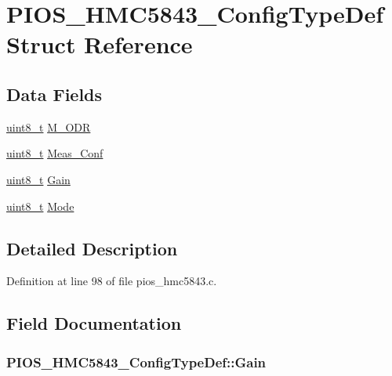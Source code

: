 \hypertarget{struct_p_i_o_s___h_m_c5843___config_type_def}{\section{P\-I\-O\-S\-\_\-\-H\-M\-C5843\-\_\-\-Config\-Type\-Def Struct Reference}
\label{struct_p_i_o_s___h_m_c5843___config_type_def}
}
\subsection*{Data Fields}
\begin{DoxyCompactItemize}
\item 
\hyperlink{stdint_8h_aba7bc1797add20fe3efdf37ced1182c5}{uint8\-\_\-t} \hyperlink{struct_p_i_o_s___h_m_c5843___config_type_def_a29d80c591af9391d345a4f8ef883f67d}{M\-\_\-\-O\-D\-R}
\item 
\hyperlink{stdint_8h_aba7bc1797add20fe3efdf37ced1182c5}{uint8\-\_\-t} \hyperlink{struct_p_i_o_s___h_m_c5843___config_type_def_a6022f43c01ccf2eb427a5b578ed3e77f}{Meas\-\_\-\-Conf}
\item 
\hyperlink{stdint_8h_aba7bc1797add20fe3efdf37ced1182c5}{uint8\-\_\-t} \hyperlink{struct_p_i_o_s___h_m_c5843___config_type_def_ad8aff8e30f712fa3c7b73a6d66b96b2f}{Gain}
\item 
\hyperlink{stdint_8h_aba7bc1797add20fe3efdf37ced1182c5}{uint8\-\_\-t} \hyperlink{struct_p_i_o_s___h_m_c5843___config_type_def_a333b4ee7245dcb0c5561f1df9fe8e1fd}{Mode}
\end{DoxyCompactItemize}


\subsection{Detailed Description}


Definition at line 98 of file pios\-\_\-hmc5843.\-c.



\subsection{Field Documentation}
\hypertarget{struct_p_i_o_s___h_m_c5843___config_type_def_ad8aff8e30f712fa3c7b73a6d66b96b2f}{
\subsubsection[{Gain}]{ P\-I\-O\-S\-\_\-\-H\-M\-C5843\-\_\-\-Config\-Type\-Def\-::\-Gain}}\label{struct_p_i_o_s___h_m_c5843___config_type_def_ad8aff8e30f712fa3c7b73a6d66b96b2f}


